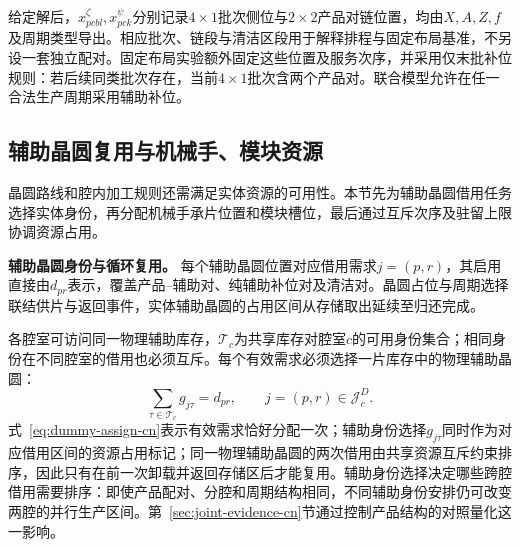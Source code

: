 \documentclass[final,5p,times,twocolumn]{elsarticle}
\begin{document}
给定解后，$x^{\zeta}_{pcbl},x^{\psi}_{pck}$分别记录$4\times1$批次侧位与$2\times2$产品对链位置，均由$X,A,Z,f$及周期类型导出。相应批次、链段与清洁区段用于解释排程与固定布局基准，不另设一套独立配对。固定布局实验额外固定这些位置及服务次序，并采用仅末批补位规则：若后续同类批次存在，当前$4\times1$批次含两个产品对。联合模型允许在任一合法生产周期采用辅助补位。

\subsection{辅助晶圆复用与机械手、模块资源}
\label{sec:model-resource-cn}

晶圆路线和腔内加工规则还需满足实体资源的可用性。本节先为辅助晶圆借用任务选择实体身份，再分配机械手承片位置和模块槽位，最后通过互斥次序及驻留上限协调资源占用。

\noindent\textbf{辅助晶圆身份与循环复用。}
每个辅助晶圆位置对应借用需求$j=(p,r)$，其启用直接由$d_{pr}$表示，覆盖产品--辅助对、纯辅助补位对及清洁对。晶圆占位与周期选择联结供片与返回事件，实体辅助晶圆的占用区间从存储取出延续至归还完成。

各腔室可访问同一物理辅助库存，$\mathcal T_c$为共享库存对腔室$c$的可用身份集合；相同身份在不同腔室的借用也必须互斥。每个有效需求必须选择一片库存中的物理辅助晶圆：
\begin{equation}
\sum_{\tau\in\mathcal T_c}g_{j\tau}=d_{pr},
\qquad j=(p,r)\in\mathcal J_c^D.
\label{eq:dummy-assign-cn}
\end{equation}
式~\eqref{eq:dummy-assign-cn}表示有效需求恰好分配一次；辅助身份选择$g_{j\tau}$同时作为对应借用区间的资源占用标记；同一物理辅助晶圆的两次借用由共享资源互斥约束排序，因此只有在前一次卸载并返回存储区后才能复用。辅助身份选择决定哪些跨腔借用需要排序：即使产品配对、分腔和周期结构相同，不同辅助身份安排仍可改变两腔的并行生产区间。第~\ref{sec:joint-evidence-cn}节通过控制产品结构的对照量化这一影响。
\end{document}
